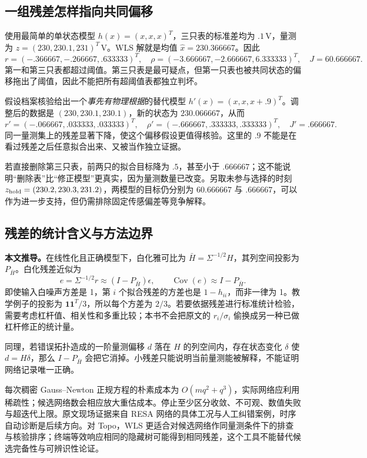\subsection{一组残差怎样指向共同偏移}

\begin{example}[三只电表与一项相别偏移假设]
使用最简单的单状态模型 $h(x)=(x,x,x)^T$，三只表的标准差均为 $.1\,\mathrm V$，量测为
$z=(230,230.1,231)^T\,\mathrm V$。WLS 解就是均值
$\hat x=230.366667$。因此
\[
 r=(-.366667,-.266667,.633333)^T,\quad
 \rho=(-3.666667,-2.666667,6.333333)^T,
 \quad J=60.666667.
\]
第一和第三只表都超过阈值。第三只表是最可疑点，但第一只表也被共同状态的偏移拖出了阈值，因此不能把所有超阈值表都独立判坏。

假设档案核验给出一个\emph{事先有物理根据}的替代模型
$h'(x)=(x,x,x+.9)^T$。调整后的数据是
$(230,230.1,230.1)$，新的状态为 $230.066667$，从而
\[
 r'=(-.066667,.033333,.033333)^T,\quad
 \rho'=(-.666667,.333333,.333333)^T,\quad J'=.666667.
\]
同一量测集上的残差显著下降，使这个偏移假设更值得核验。这里的 $.9$ 不能是在看过残差之后任意拟合出来、又被当作独立证据。

若直接删除第三只表，前两只的拟合目标降为 $.5$，甚至小于 $.666667$；这不能说明“删除表”比“修正模型”更真实，因为量测数量已改变。另取未参与选择的时刻
$z_{\rm hold}=(230.2,230.3,231.2)$，两模型的目标仍分别为 $60.666667$ 与 $.666667$，可以作为进一步支持，但仍需排除固定传感偏差等竞争解释。
\end{example}

\subsection{残差的统计含义与方法边界}

\textbf{本文推导。}在线性化且正确模型下，白化雅可比为
$\bar H=\Sigma^{-1/2}H$，其列空间投影为 $P_{\bar H}$。白化残差近似为
\begin{equation}
 e=\Sigma^{-1/2}r\approx(I-P_{\bar H})\epsilon,
 \qquad \operatorname{Cov}(e)\approx I-P_{\bar H}.
 \label{eq:dq_s9_leverage}
\end{equation}
即使输入白噪声方差是 1，第 $i$ 个拟合残差的方差也是 $1-h_{ii}$，而非一律为 1。教学例子的投影为 $\boldsymbol1\boldsymbol1^T/3$，所以每个方差为 $2/3$。若要依据残差进行标准统计检验，需要考虑杠杆值、相关性和多重比较；本书不会把原文的 $r_i/\sigma_i$ 偷换成另一种已做杠杆修正的统计量。

同理，若错误拓扑造成的一阶量测偏移 $d$ 落在 $H$ 的列空间内，存在状态变化 $\delta$ 使 $d=H\delta$，那么 $I-P_{\bar H}$ 会把它消掉。小残差只能说明当前量测能被解释，不能证明网络记录唯一正确。

每次稠密 Gauss--Newton 正规方程的朴素成本为 $O(mq^2+q^3)$，实际网络应利用稀疏性；候选网络数会相应放大重估成本。停止至少区分收敛、不可观、数值失败与超迭代上限。原文现场证据来自 RESA 网络的具体工况与人工纠错案例，时序自动诊断是后续方向。对 Topo，WLS 更适合对候选网络作同量测条件下的排查与核验排序；终端等效响应相同的隐藏树可能得到相同残差，这个工具不能替代候选完备性与可辨识性论证。

